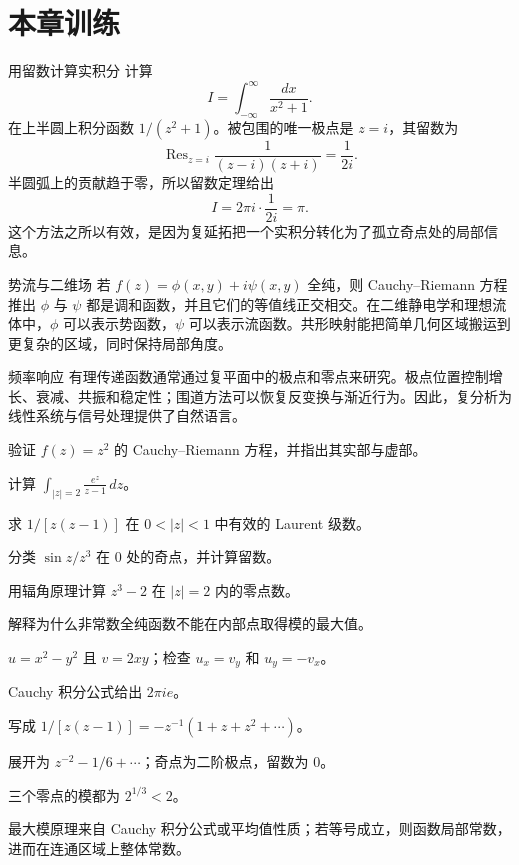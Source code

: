 \section{本章训练}

\begin{workedexample}{用留数计算实积分}
计算
\[
    I=\int_{-\infty}^{\infty}\frac{dx}{x^2+1}.
\]
在上半圆上积分函数 $1/(z^2+1)$。被包围的唯一极点是 $z=i$，其留数为
\[
    \operatorname{Res}_{z=i}\frac1{(z-i)(z+i)}=\frac1{2i}.
\]
半圆弧上的贡献趋于零，所以留数定理给出
\[
    I=2\pi i\cdot\frac1{2i}=\pi.
\]
这个方法之所以有效，是因为复延拓把一个实积分转化为了孤立奇点处的局部信息。
\end{workedexample}

\begin{applicationbox}{势流与二维场}
若 $f(z)=\phi(x,y)+i\psi(x,y)$ 全纯，则 Cauchy--Riemann 方程推出 $\phi$ 与 $\psi$ 都是调和函数，并且它们的等值线正交相交。在二维静电学和理想流体中，$\phi$ 可以表示势函数，$\psi$ 可以表示流函数。共形映射能把简单几何区域搬运到更复杂的区域，同时保持局部角度。
\end{applicationbox}

\begin{applicationbox}{频率响应}
有理传递函数通常通过复平面中的极点和零点来研究。极点位置控制增长、衰减、共振和稳定性；围道方法可以恢复反变换与渐近行为。因此，复分析为线性系统与信号处理提供了自然语言。
\end{applicationbox}

\begin{chapterexercises}
    \item 验证 $f(z)=z^2$ 的 Cauchy--Riemann 方程，并指出其实部与虚部。
    \item 计算 $\int_{|z|=2}\frac{e^z}{z-1}\,dz$。
    \item 求 $1/[z(z-1)]$ 在 $0<|z|<1$ 中有效的 Laurent 级数。
    \item 分类 $\sin z/z^3$ 在 $0$ 处的奇点，并计算留数。
    \item 用辐角原理计算 $z^3-2$ 在 $|z|=2$ 内的零点数。
    \item 解释为什么非常数全纯函数不能在内部点取得模的最大值。
\end{chapterexercises}

\begin{selectedhints}
    \item $u=x^2-y^2$ 且 $v=2xy$；检查 $u_x=v_y$ 和 $u_y=-v_x$。
    \item Cauchy 积分公式给出 $2\pi i e$。
    \item 写成 $1/[z(z-1)]=-z^{-1}(1+z+z^2+\cdots)$。
    \item 展开为 $z^{-2}-1/6+\cdots$；奇点为二阶极点，留数为 $0$。
    \item 三个零点的模都为 $2^{1/3}<2$。
    \item 最大模原理来自 Cauchy 积分公式或平均值性质；若等号成立，则函数局部常数，进而在连通区域上整体常数。
\end{selectedhints}
